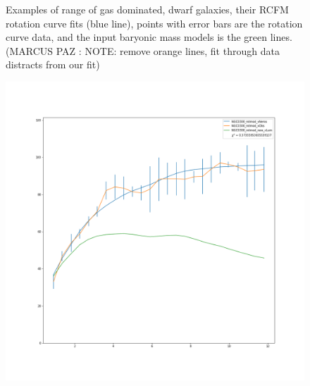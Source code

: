 \documentclass[reprint,%
 amsmath,amssymb,
 aps,
]{revtex4-1}
\begin{document}
\begin{figure}
\begin{minipage}{.5\textwidth}
  \label{fig:test1}
\end{minipage}
 \caption{Examples of range of gas dominated, dwarf galaxies, their RCFM rotation curve fits (blue line), points with error bars are the rotation curve data, and the input baryonic mass models is  the green lines. (MARCUS PAZ : NOTE: remove orange lines, fit through data distracts from our fit)  }
\end{figure}
 
            
\begin{figure}
\centering
\begin{minipage}{.5\textwidth}
  \centering
  \includegraphics[width=.95\linewidth]{figures/NGC0300_rotmod_XueSofue.png}
  \label{fig:test1}
\end{minipage}%
\begin{minipage}{.5\textwidth}
  \centering

\end{minipage}
\end{figure}
\end{document}
